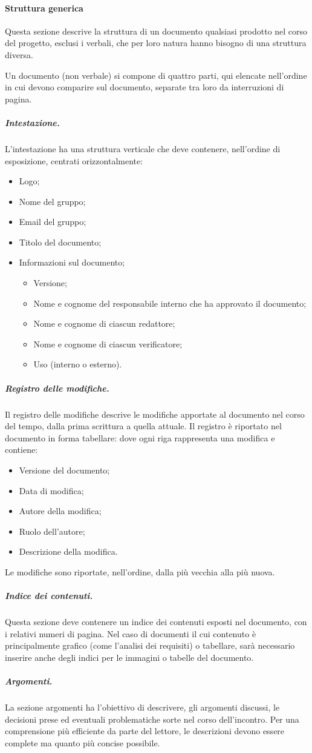 \paragraph{Struttura generica}
Questa sezione descrive la struttura di un documento qualsiasi prodotto nel corso del progetto, esclusi i verbali, che per loro natura hanno bisogno di una struttura diversa.
\par Un documento (non verbale) si compone di quattro parti, qui elencate nell'ordine in cui devono comparire sul documento, separate tra loro da interruzioni di pagina.
\subparagraph{Intestazione.}
L'intestazione ha una struttura verticale che deve contenere, nell'ordine di esposizione, centrati orizzontalmente:
\begin{itemize}
    \item Logo;
    \item Nome del gruppo;
    \item Email del gruppo;
    \item Titolo del documento;
    \item Informazioni sul documento;
    \begin{itemize}
        \item Versione;
        \item Nome e cognome del responsabile interno che ha approvato il documento;
        \item Nome e cognome di ciascun redattore;
        \item Nome e cognome di ciascun verificatore;
        \item Uso (interno o esterno).
    \end{itemize}
\end{itemize}
\subparagraph{Registro delle modifiche.}
Il registro delle modifiche descrive le modifiche apportate al documento nel corso del tempo, dalla prima scrittura a quella attuale. Il registro è riportato nel documento in forma tabellare: dove ogni riga rappresenta una modifica e contiene:
\begin{itemize}
    \item Versione del documento;
    \item Data di modifica;
    \item Autore della modifica;
    \item Ruolo dell'autore;
    \item Descrizione della modifica.
\end{itemize}
Le modifiche sono riportate, nell'ordine, dalla più vecchia alla più nuova.
\subparagraph{Indice dei contenuti.}
Questa sezione deve contenere un indice dei contenuti esposti nel documento, con i relativi numeri di pagina. Nel caso di documenti il cui contenuto è principalmente grafico (come l'analisi dei requisiti) o tabellare, sarà necessario inserire anche degli indici per le immagini o tabelle del documento.
\subparagraph{Argomenti.}
La sezione argomenti ha l'obiettivo di descrivere, gli argomenti discussi, le decisioni prese ed eventuali problematiche sorte nel corso dell'incontro. Per una comprensione più efficiente da parte del lettore, le descrizioni devono essere complete ma quanto più concise possibile.

